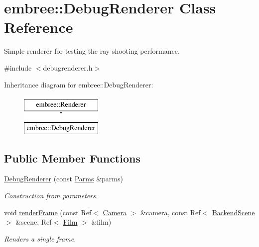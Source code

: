 \hypertarget{classembree_1_1_debug_renderer}{
\section{embree::DebugRenderer Class Reference}
\label{classembree_1_1_debug_renderer}
}


Simple renderer for testing the ray shooting performance.  




{\ttfamily \#include $<$debugrenderer.h$>$}

Inheritance diagram for embree::DebugRenderer:\begin{figure}[H]
\begin{center}
\leavevmode
\includegraphics[height=2.000000cm]{classembree_1_1_debug_renderer}
\end{center}
\end{figure}
\subsection*{Public Member Functions}
\begin{DoxyCompactItemize}
\item 
\hyperlink{classembree_1_1_debug_renderer_a56d2b9b04323a2069bc59e2703078f5c}{DebugRenderer} (const \hyperlink{classembree_1_1_parms}{Parms} \&parms)
\begin{DoxyCompactList}\small\item\em Construction from parameters. \item\end{DoxyCompactList}\item 
void \hyperlink{classembree_1_1_debug_renderer_a98745dd04e9ec45e509f4f68789d9cfc}{renderFrame} (const Ref$<$ \hyperlink{classembree_1_1_camera}{Camera} $>$ \&camera, const Ref$<$ \hyperlink{classembree_1_1_backend_scene}{BackendScene} $>$ \&scene, Ref$<$ \hyperlink{classembree_1_1_film}{Film} $>$ \&film)
\begin{DoxyCompactList}\small\item\em Renders a single frame. \item\end{DoxyCompactList}\end{DoxyCompactItemize}


